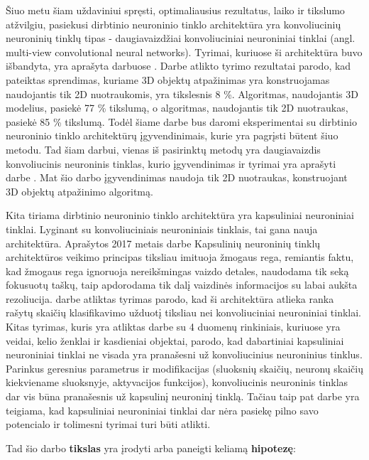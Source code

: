Šiuo metu šiam uždaviniui spręsti, optimaliausius  rezultatus, laiko ir tikslumo atžvilgiu, pasiekusi dirbtinio neuroninio tinklo architektūra yra konvoliucinių neuroninių tinklų tipas - daugiavaizdžiai konvoliuciniai neuroniniai tinklai (angl. multi-view convolutional neural networks). Tyrimai, kuriuose ši architektūra buvo išbandyta, yra aprašyta darbuose \cite{cnnExp1, cnnExp2}. Darbe \cite{dbnExp} atlikto tyrimo rezultatai parodo, kad pateiktas sprendimas, kuriame 3D objektų atpažinimas yra konstruojamas naudojantis tik 2D nuotraukomis, yra tikslesnis 8 \%. Algoritmas, naudojantis 3D modelius, pasiekė 77 \% tikslumą, o algoritmas, naudojantis tik 2D nuotraukas, pasiekė 85 \% tikslumą. Todėl šiame darbe bus daromi eksperimentai su dirbtinio neuroninio tinklo architektūrų įgyvendinimais, kurie yra pagrįsti būtent šiuo metodu. Tad šiam darbui, vienas iš pasirinktų metodų yra daugiavaizdis konvoliucinis neuroninis tinklas, kurio įgyvendinimas ir tyrimai yra aprašyti darbe \cite{cnnExp1}. Mat šio darbo įgyvendinimas naudoja tik 2D nuotraukas, konstruojant 3D objektų atpažinimo algoritmą.

Kita tiriama dirbtinio neuroninio tinklo architektūra yra kapsuliniai neuroniniai tinklai. Lyginant su konvoliuciniais neuroniniais tinklais, tai gana nauja architektūra. Aprašytos 2017 metais \cite{capsNet} darbe Kapsulinių neuroninių tinklų architektūros veikimo principas tiksliau imituoja žmogaus rega, remiantis faktu, kad žmogaus rega ignoruoja nereikšmingas vaizdo detales, naudodama tik seką fokusuotų taškų, taip apdorodama tik dalį vaizdinės informacijos su labai aukšta rezoliucija. \cite{capsNet} darbe atliktas tyrimas parodo, kad ši architektūra atlieka ranka rašytų skaičių klasifikavimo užduotį tiksliau nei konvoliuciniai neuroniniai tinklai. Kitas tyrimas, kuris yra atliktas darbe \cite{capsCNN} su 4 duomenų rinkiniais, kuriuose yra veidai, kelio ženklai ir kasdieniai objektai, parodo, kad dabartiniai kapsuliniai neuroniniai tinklai ne visada yra pranašesni už konvoliucinius neuroninius tinklus. Parinkus geresnius parametrus ir modifikacijas (sluoksnių skaičių, neuronų skaičių kiekviename sluoksnyje, aktyvacijos funkcijos), konvoliucinis neuroninis tinklas dar vis būna pranašesnis už kapsulinį neuroninį tinklą. Tačiau taip pat darbe \cite{capsCNN} yra teigiama, kad kapsuliniai neuroniniai tinklai dar nėra pasiekę pilno savo potencialo ir tolimesni tyrimai turi būti atlikti.

Tad šio darbo \textbf{tikslas} yra įrodyti arba paneigti keliamą \textbf{hipotezę}:

